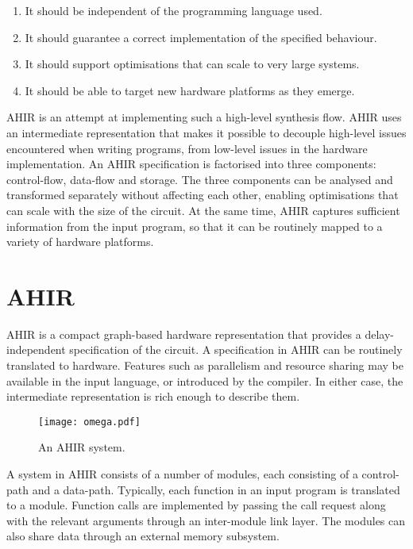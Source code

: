 \documentclass[12pt]{article}
\begin{document}
\begin{enumerate}
  \item It should be independent of the programming language
        used.
  \item It should guarantee a correct implementation of the
        specified behaviour.
  \item It should support optimisations that can scale to very
        large systems.
  \item It should be able to target new hardware platforms as
        they emerge.
\end{enumerate}

AHIR is an attempt at implementing such a high-level synthesis flow. 
AHIR uses an intermediate representation that makes it possible to
decouple high-level issues encountered when writing programs, from
low-level issues in the hardware implementation. An AHIR specification
is factorised into three components: control-flow, data-flow and
storage. The three components can be analysed and transformed
separately without affecting each other, enabling optimisations that
can scale with the size of the circuit. At the same time, AHIR
captures sufficient information from the input program, so that it can
be routinely mapped to a variety of hardware platforms.

\section{AHIR}

AHIR is a compact graph-based hardware representation that provides a
delay-independent specification of the circuit. A specification in
AHIR can be routinely translated to hardware. Features such as
parallelism and resource sharing may be available in the input
language, or introduced by the compiler. In either case, the
intermediate representation is rich enough to describe them.

\begin{figure}[h]
  \centering
  \texttt{[image: omega.pdf]}
  \caption{An AHIR system.}
  \label{fig:system}
\end{figure}

A system in AHIR consists of a number of modules, each consisting of a
control-path and a data-path. Typically, each function in an input
program is translated to a module. Function calls are implemented by
passing the call request along with the relevant arguments through an
inter-module link layer. The modules can also share data through an
external memory subsystem.
\end{document}
